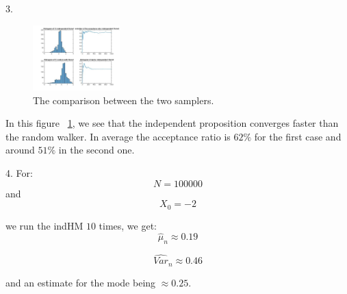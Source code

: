 \documentclass[paper=a4, fontsize=11pt]{scrartcl} %
\numberwithin{equation}{section} %
\numberwithin{figure}{section} %
\numberwithin{table}{section} %
\begin{document}
	3. 
	\begin{figure}
		\centering
		\includegraphics[width=0.3\textwidth]{comparison}
		\caption{\label{fig:comp}The comparison between the two samplers.}
	\end{figure}
	
	In this figure ~\ref{fig:comp}, we see that the independent proposition converges faster than the random walker. In average the acceptance ratio is $62\%$ for the first case and around $51\%$ in the second one. 
	
	4. For: $$N=100000$$
	and $$X_0=-2$$
	
	we run the indHM $10$ times, we get:
	$$\hat{\mu}_n \approx 0.19$$
	
	$$ \widehat{Var} _n \approx 0.46 $$
	 
	 and an estimate for the mode being $\approx 0.25$.
	  
	
\end{document}
